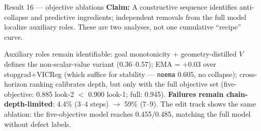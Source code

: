 \documentclass[aspectratio=169,10pt]{beamer}
\newcommand{\claim}[1]{\textcolor{cviolet}{\textbf{Claim:} #1}}
\begin{document}
\begin{frame}{Result 16 --- objective ablations}
\claim{A constructive sequence identifies anti-collapse and predictive
ingredients; independent removals from the full model localize auxiliary
roles. These are two analyses, not one cumulative ``recipe'' curve.}
\smallskip
\centering\small
{}

\medskip\small
Auxiliary roles remain identifiable: goal monotonicity + geometry-distilled
$V$ defines the non-scalar-value variant (0.36--0.57);
EMA = $+$0.03 over stopgrad+VICReg (which suffice for stability ---
\texttt{noema} 0.605, no collapse); cross-horizon ranking calibrates depth,
but only with the full objective set (five-objective: 0.885 look-2 $<$ 0.900
look-1; full: 0.945). \textbf{Failures remain chain-depth-limited}: 4.4\%
(3--4 steps) $\to$ 59\% (7--9). The edit track shows the same ablation:
the five-objective model reaches 0.455/0.485, matching the full model without
defect labels.
\end{frame}
\end{document}
